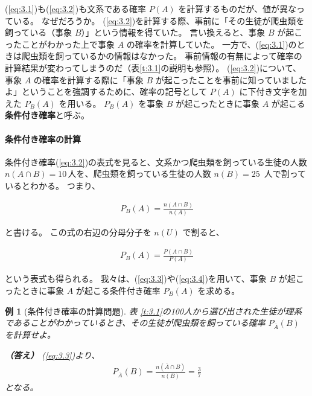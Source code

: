 \documentclass[12pt]{ltjsarticle}\usepackage{ifthen}\newcounter{enlarge}\setcounter{enlarge}{1}
\newtheorem{eg}{例}
\begin{document}
(\ref{eq:3.1})も(\ref{eq:3.2})も文系である確率 $P(A)$ を計算するものだが、値が異なっている。
なぜだろうか。
(\ref{eq:3.2})を計算する際、事前に「その生徒が爬虫類を飼っている（事象 $B$）」という情報を得ていた。
言い換えると、事象 $B$ が起こったことがわかった上で事象 $A$ の確率を計算していた。
一方で、(\ref{eq:3.1})のときは爬虫類を飼っているかの情報はなかった。
事前情報の有無によって確率の計算結果が変わってしまうのだ（表\ref{t:3.1}の説明も参照）。
(\ref{eq:3.2})について、事象 $A$ の確率を計算する際に「事象 $B$ が起こったことを事前に知っていましたよ」ということを強調するために、確率の記号として $P(A)$ に下付き文字を加えた $P_B (A)$ を用いる。
$P_B (A)$ を事象 $B$ が起こったときに事象 $A$ が起こる\textbf{条件付き確率}と呼ぶ。

\paragraph{条件付き確率の計算}

条件付き確率(\ref{eq:3.2})の表式を見ると、文系かつ爬虫類を飼っている生徒の人数 $n(A \cap B) = 10\,$人を、爬虫類を飼っている生徒の人数 $n(B) = 25\,$ 人で割っているとわかる。
つまり、
\begin{oframed}
  \begin{align}
    P_B (A) = \frac{n(A \cap B)}{n(A)} \label{eq:3.3}
  \end{align}
\end{oframed}
\noindent
と書ける。
この式の右辺の分母分子を $n(U)$ で割ると、
\begin{oframed}
  \begin{align}
    P_B (A) = \frac{P(A \cap B)}{P(A)} \label{eq:3.4}
  \end{align}
\end{oframed}
\noindent
という表式も得られる。
我々は、(\ref{eq:3.3})や(\ref{eq:3.4})を用いて、事象 $B$ が起こったときに事象 $A$ が起こる条件付き確率 $P_B (A)$ を求める。

\begin{eg}[条件付き確率の計算問題]
  表 \ref{t:3.1}の100人から選び出された生徒が理系であることがわかっているとき、その生徒が爬虫類を飼っている確率 $P_{\overline{A}} (B)$ を計算せよ。

  \textbf{（答え）}
  (\ref{eq:3.3})より、
  \begin{align}
    P_{\overline{A}} (B) = \frac{n(\overline{A} \cap B)}{n(B)} = \frac{3}{7} \label{eq:3.5}
  \end{align}
  となる。
\end{eg}
\end{document}
